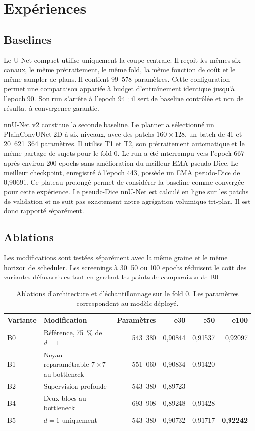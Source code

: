 \documentclass[11pt,a4paper]{article}
\begin{document}
\section{Expériences}

\subsection{Baselines}

Le U-Net \cite{ronneberger2015unet} compact utilise uniquement la coupe
centrale. Il reçoit les mêmes six canaux, le même prétraitement, le même fold,
la même fonction de coût et le même sampler de plans. Il contient 99~578
paramètres. Cette configuration permet une comparaison appariée à budget
d'entraînement identique jusqu'à l'epoch 90. Son run s'arrête à l'epoch 94 ; il
sert de baseline contrôlée et non de résultat à convergence garantie.

nnU-Net v2 \cite{isensee2021nnunet} constitue la seconde baseline. Le planner a
sélectionné un PlainConvUNet 2D à six niveaux, avec des patchs $160\times128$,
un batch de 41 et 20~621~364 paramètres. Il utilise T1 et T2, son prétraitement
automatique et le même partage de sujets pour le fold 0. Le run a été interrompu
vers l'epoch 667 après environ 200 epochs sans amélioration du meilleur EMA
pseudo-Dice. Le meilleur checkpoint, enregistré à l'epoch 443, possède un EMA
pseudo-Dice de 0,90691. Ce plateau prolongé permet de considérer la baseline
comme convergée pour cette expérience. Le pseudo-Dice nnU-Net est calculé en
ligne sur les patchs de validation et ne suit pas exactement notre agrégation
volumique tri-plan. Il est donc rapporté séparément.

\subsection{Ablations}

Les modifications sont testées séparément avec la même graine et le même
horizon de scheduler. Les screenings à 30, 50 ou 100 epochs réduisent le coût
des variantes défavorables tout en gardant les points de comparaison de B0.

\begin{table}[htbp]
\centering
\small
\caption{Ablations d'architecture et d'échantillonnage sur le fold 0. Les
paramètres correspondent au modèle déployé.}
\label{tab:ablations}
\begin{tabularx}{\textwidth}{@{}lYrrrr@{}}
\toprule
Variante & Modification & Paramètres & e30 & e50 & e100 \\
\midrule
B0 & Référence, 75~\% de $d=1$ & 543~380 & 0,90844 & 0,91537 & 0,92097 \\
B1 & Noyau reparamétrable $7\times7$ au bottleneck & 551~060 & 0,90834 & 0,91420 & -- \\
B2 & Supervision profonde & 543~380 & 0,89723 & -- & -- \\
B4 & Deux blocs au bottleneck & 693~908 & 0,89248 & 0,91428 & -- \\
B5 & $d=1$ uniquement & 543~380 & 0,90732 & 0,91717 & \textbf{0,92242} \\
\bottomrule
\end{tabularx}
\end{table}
\end{document}
